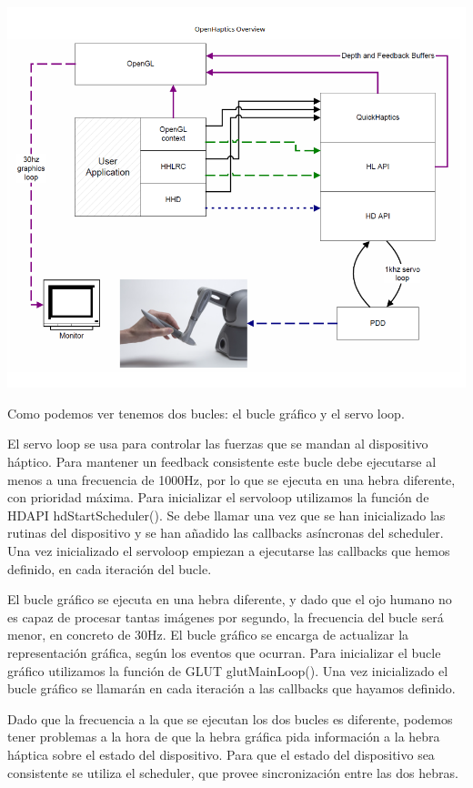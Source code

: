 \documentclass[a4paper,11pt, oneside]{book}
\begin{document}
\includegraphics[scale=0.4]{estructura}

Como podemos ver tenemos dos bucles: el bucle gráfico y el servo loop.

El servo loop se usa para controlar las fuerzas que se mandan al dispositivo háptico. Para mantener un feedback consistente este bucle debe ejecutarse al menos a una frecuencia de 1000Hz, por lo que se ejecuta en una hebra diferente, con prioridad máxima. Para inicializar el servoloop utilizamos la función de HDAPI hdStartScheduler(). Se debe llamar una vez que se han inicializado las rutinas del dispositivo y se han añadido las callbacks asíncronas del scheduler. Una vez inicializado el servoloop empiezan a ejecutarse las callbacks que hemos definido, en cada iteración del bucle.

El bucle gráfico se ejecuta en una hebra diferente, y dado que el ojo humano no es capaz de procesar tantas imágenes por segundo, la frecuencia del bucle será menor, en concreto de 30Hz. El bucle gráfico se encarga de actualizar la representación gráfica, según los eventos que ocurran. Para inicializar el bucle gráfico utilizamos la función de GLUT glutMainLoop(). Una vez inicializado el bucle gráfico se llamarán en cada iteración a las callbacks que hayamos definido.

Dado que la frecuencia a la que se ejecutan los dos bucles es diferente, podemos tener problemas a la hora de que la hebra gráfica pida información a la hebra háptica sobre el estado del dispositivo. Para que el estado del dispositivo sea consistente se utiliza el scheduler, que provee sincronización entre las dos hebras.
\end{document}
